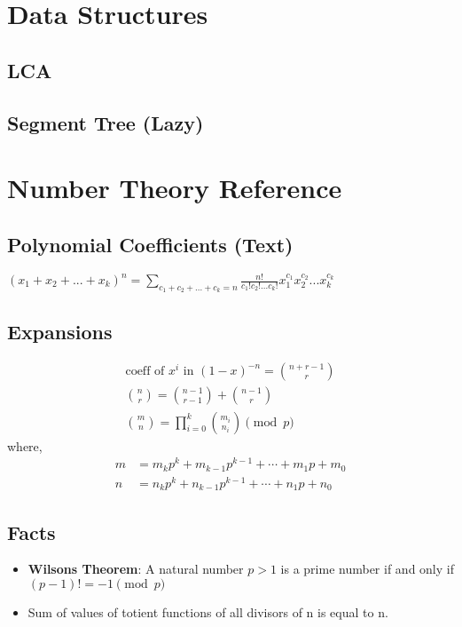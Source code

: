 \documentclass[12pt]{extarticle}
\begin{document}
\begin{multicols*}{2}
\section{Data Structures}
\subsection{LCA} %


\subsection{Segment Tree (Lazy)} %



\section{Number Theory Reference}
\subsection{Polynomial Coefficients (Text)} %
$(x_1 + x_2 + ... + x_k)^n = \sum_{c_1 + c_2 + ... + c_k = n}
\frac{n!}{c_1! c_2! ... c_k!} x_1^{c_1} x_2^{c_2} ... x_k^{c_k}$
\subsection{Expansions}
\begin{gather*}
\text{coeff of }x^i \text{ in } (1-x)^{-n} = {n+r-1 \choose r}\\
{n \choose r} = {n-1 \choose r-1} + {n-1 \choose r}\\
{m \choose n} = \prod_{i=0}^{k}{\binom {m_{i}}{n_{i}}}{\pmod {p}}
\end{gather*}
where,
\begin{align*}
m&=m_{k}p^{k}+m_{k-1}p^{k-1}+\cdots +m_{1}p+m_{0}\\
n&=n_{k}p^{k}+n_{k-1}p^{k-1}+\cdots +n_{1}p+n_{0}
\end{align*}
\subsection{Facts}
\begin{itemize}
\item \textbf{Wilsons Theorem}: A natural number $p > 1$ is a prime number if and only if
$ (p-1)! = -1 \pmod{p} $
\item Sum of values of totient functions of all divisors of n is equal to n.
\end{itemize}

\end{multicols*}
\end{document}
